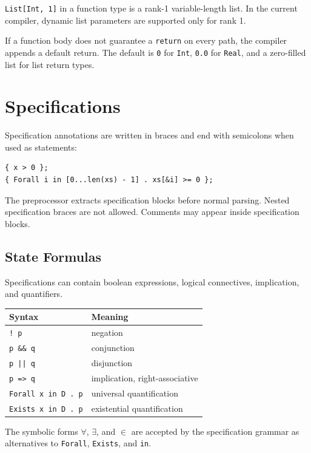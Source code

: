 \documentclass[11pt]{article}
\begin{document}
\texttt{List[Int, 1]} in a function type is a rank-1 variable-length list. In the current compiler, dynamic list parameters are supported only for rank 1.

If a function body does not guarantee a \texttt{return} on every path, the compiler appends a default return. The default is \texttt{0} for \texttt{Int}, \texttt{0.0} for \texttt{Real}, and a zero-filled list for list return types.

\section{Specifications}

Specification annotations are written in braces and end with semicolons when used as statements:

\begin{lstlisting}
{ x > 0 };
{ Forall i in [0...len(xs) - 1] . xs[&i] >= 0 };
\end{lstlisting}

The preprocessor extracts specification blocks before normal parsing. Nested specification braces are not allowed. Comments may appear inside specification blocks.

\subsection{State Formulas}

Specifications can contain boolean expressions, logical connectives, implication, and quantifiers.

\begin{center}
\begin{tabular}{ll}
\toprule
Syntax & Meaning \\
\midrule
\texttt{! p} & negation \\
\texttt{p \&\& q} & conjunction \\
\texttt{p || q} & disjunction \\
\texttt{p => q} & implication, right-associative \\
\texttt{Forall x in D . p} & universal quantification \\
\texttt{Exists x in D . p} & existential quantification \\
\bottomrule
\end{tabular}
\end{center}

The symbolic forms \(\forall\), \(\exists\), and \(\in\) are accepted by the specification grammar as alternatives to \texttt{Forall}, \texttt{Exists}, and \texttt{in}.
\end{document}
